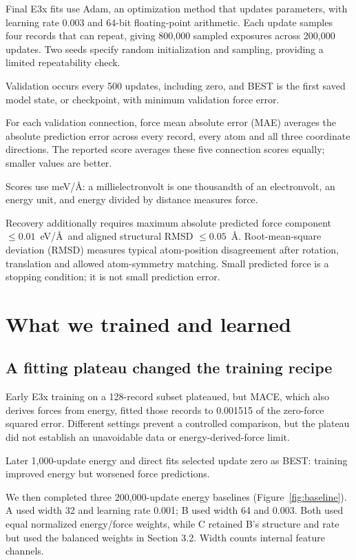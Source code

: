 \documentclass{article}
\begin{document}
Final E3x fits use Adam, an optimization method that updates parameters, with learning rate 0.003 and 64-bit floating-point arithmetic. Each update samples four records that can repeat, giving 800,000 sampled exposures across 200,000 updates. Two seeds specify random initialization and sampling, providing a limited repeatability check.

Validation occurs every 500 updates, including zero, and BEST is the first saved model state, or checkpoint, with minimum validation force error.

For each validation connection, force mean absolute error (MAE) averages the absolute prediction error across every record, every atom and all three coordinate directions. The reported score averages these five connection scores equally; smaller values are better.

Scores use meV/\AA: a millielectronvolt is one thousandth of an electronvolt, an energy unit, and energy divided by distance measures force.

Recovery additionally requires maximum absolute predicted force component $\leq0.01$~eV/\AA\ and aligned structural RMSD $\leq0.05$~\AA. Root-mean-square deviation (RMSD) measures typical atom-position disagreement after rotation, translation and allowed atom-symmetry matching. Small predicted force is a stopping condition; it is not small prediction error.

\section{What we trained and learned}
\subsection{A fitting plateau changed the training recipe}
Early E3x training on a 128-record subset plateaued, but MACE, which also derives forces from energy, fitted those records to 0.001515 of the zero-force squared error. Different settings prevent a controlled comparison, but the plateau did not establish an unavoidable data or energy-derived-force limit.

Later 1,000-update energy and direct fits selected update zero as BEST: training improved energy but worsened force predictions.

We then completed three 200,000-update energy baselines (Figure~\ref{fig:baseline}). A used width 32 and learning rate 0.001; B used width 64 and 0.003. Both used equal normalized energy/force weights, while C retained B's structure and rate but used the balanced weights in Section 3.2. Width counts internal feature channels.
\end{document}
